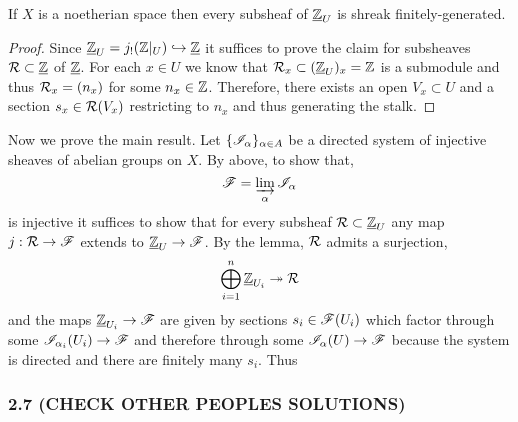 \documentclass[12pt]{article}
\begin{document}
\begin{lemma}
If $X$ is a noetherian space then every subsheaf of $\underline{\mathbb{Z}}_U$ is shreak finitely-generated.
\end{lemma}

\begin{proof}
Since $\underline{\mathbb{Z}}_U = j_!(\mathbb{Z}|_U) \hookrightarrow \underline{\mathbb{Z}}$ it suffices to prove the claim for subsheaves $\mathcal{R} \subset \underline{\mathbb{Z}}$ of $\underline{\mathbb{Z}}$. For each $x \in U$ we know that $\mathcal{R}_x \subset (\underline{\mathbb{Z}}_U)_x = \mathbb{Z}$ is a submodule and thus $\mathcal{R}_x = (n_x)$ for some $n_x \in \mathbb{Z}$. Therefore, there exists an open $V_x \subset U$ and a section $s_x \in \mathcal{R}(V_x)$ restricting to $n_x$ and thus generating the stalk.  
\end{proof}

\noindent
Now we prove the main result. Let $\{ \mathscr{I}_\alpha \}_{\alpha \in A}$ be a directed system of injective sheaves of abelian groups on $X$. By above, to show that,
\[ \mathscr{F} = \varinjlim_{\alpha} \mathscr{I}_\alpha \]
is injective it suffices to show that for every subsheaf $\mathcal{R} \subset \underline{\mathbb{Z}}_U$ any map $j : \mathcal{R} \to \mathscr{F}$ extends to $\underline{\mathbb{Z}}_U \to \mathscr{F}$. By the lemma, $\mathcal{R}$ admits a surjection,
\[ \bigoplus_{i = 1}^n \underline{\mathbb{Z}}_{U_i} \twoheadrightarrow \mathcal{R} \]
and the maps $\underline{\mathbb{Z}}_{U_i} \to \mathscr{F}$ are given by sections $s_i \in \mathscr{F}(U_i)$ which factor through some $\mathscr{I}_{\alpha_i}(U_i) \to \mathscr{F}$ and therefore through some $\mathscr{I}_{\alpha}(U) \to \mathscr{F}$ because the system is directed and there are finitely many $s_i$. Thus 

\subsubsection{2.7 (CHECK OTHER PEOPLES SOLUTIONS)}
\end{document}

